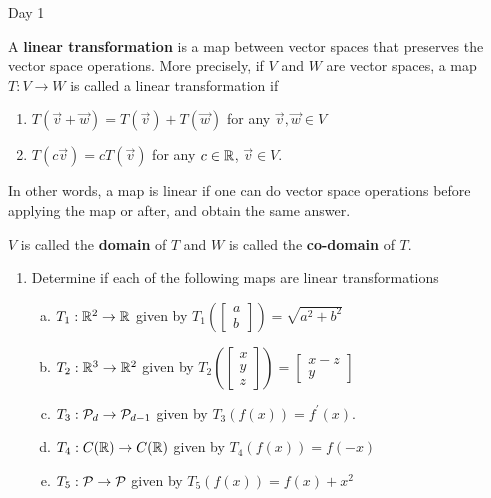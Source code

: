 \documentclass{article}
\begin{document}
Day 1
\begin{app}
A {\bf linear transformation} is a map between vector spaces that preserves the vector space operations.  More precisely, if $V$ and $W$ are vector spaces, a map $T:V\rightarrow W$ is called a linear transformation if
\begin{enumerate}
\item $T(\vec{v}+\vec{w}) = T(\vec{v})+T(\vec{w})$ for any $\vec{v},\vec{w} \in V$
\item $T(c\vec{v}) = cT(\vec{v})$ for any $c \in \IR$, $\vec{v} \in V$.
\end{enumerate}
In other words, a map is linear if one can do vector space operations before applying the map or after, and obtain the same answer.

$V$ is called the {\bf domain} of $T$ and $W$ is called the {\bf co-domain} of $T$.

\begin{enumerate}[1)]
\item Determine if each of the following maps are linear transformations
\begin{enumerate}[(a)]
\item $T_1 : \IR^2 \rightarrow \IR$ given by $T_1\left(\begin{bmatrix} a \\ b \end{bmatrix} \right) = \sqrt{a^2+b^2}$
\item $T_2 : \IR^3 \rightarrow \IR^2$ given by $T_2\left(\begin{bmatrix} x \\ y \\ z \end{bmatrix} \right) = \begin{bmatrix} x-z \\ y \end{bmatrix}$
\item $T_3: \P_d \rightarrow \P_{d-1}$ given by $T_3(f(x)) = f^\prime(x)$.
\item $T_4: C(\IR) \rightarrow C(\IR)$ given by $T_4(f(x)) = f(-x)$
\item $T_5: \P \rightarrow \P$ given by $T_5(f(x)) = f(x)+x^2$
\end{enumerate}


\end{enumerate}
\end{app}
\end{document}
